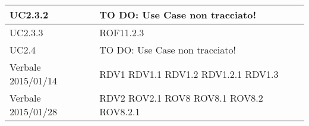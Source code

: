 \begin{center}
\begin{longtable}{| p{4cm} | p{4cm} |}
\hline
UC2.3.2 & TO DO: Use Case non tracciato! \\
\hline
UC2.3.3 & ROF11.2.3 \\
\hline
UC2.4 & TO DO: Use Case non tracciato! \\
\hline
Verbale 2015/01/14 & RDV1 \newline RDV1.1 \newline RDV1.2 \newline RDV1.2.1 \newline RDV1.3 \\
\hline
Verbale 2015/01/28 & RDV2 \newline ROV2.1 \newline ROV8 \newline ROV8.1 \newline ROV8.2 \newline ROV8.2.1 \\
\hline
\end{longtable}
\egroup
\end{center}
